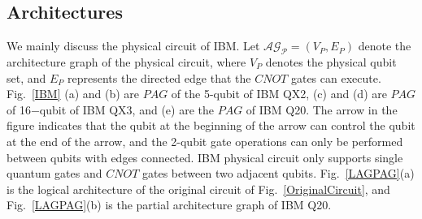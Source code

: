 \documentclass[runningheads]{llncs}
\begin{document}
\subsection{Architectures}
We mainly discuss the physical circuit of IBM. Let $\mathcal{\mathcal{AG}_{P}}=(V_{P}, E_{P})$ denote the architecture graph of the physical circuit, where $V_{P} $ denotes the physical qubit set, and $E_{P}$ represents the directed edge that the $CNOT$ gates can execute. Fig.~\ref{IBM} (a) and (b) are $PAG$ of the 5-qubit of IBM QX2, (c) and (d) are $PAG$ of 16$-$qubit of IBM QX3, 
and (e) are the $PAG$ of IBM Q20. The arrow in the figure indicates that the qubit at the beginning of the arrow can control the qubit at the end of the arrow, and the 2-qubit gate operations can only be performed between  qubits with edges connected. IBM physical circuit only supports single quantum gates and $CNOT$ gates between two adjacent qubits. Fig.~\ref{LAGPAG}(a) is the logical architecture of the original circuit of Fig.~\ref{OriginalCircuit}, and Fig.~\ref{LAGPAG}(b) is the partial architecture graph of IBM Q20. 
\end{document}
